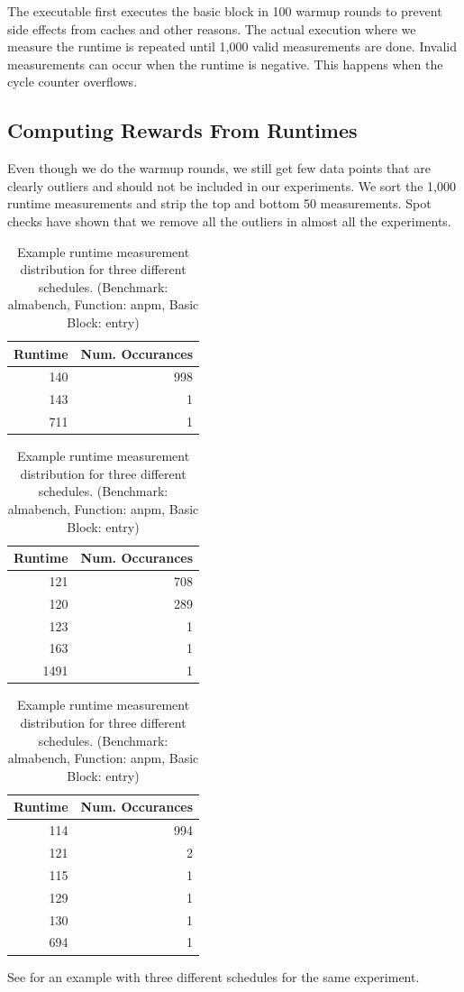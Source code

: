 The executable first executes the basic block in 100 warmup rounds to prevent side effects from caches and other reasons.
The actual execution where we measure the runtime is repeated until 1,000 valid measurements are done.
Invalid measurements can occur when the runtime is negative.
This happens when the cycle counter overflows.

\subsection{Computing Rewards From Runtimes}
Even though we do the warmup rounds, we still get few data points that are clearly outliers and should not be included in our experiments.
We sort the 1,000 runtime measurements and strip the top and bottom 50 measurements.
Spot checks have shown that we remove all the outliers in almost all the experiments.
\begin{table}
    \centering
    \begin{tabular}{@{}rr@{}}
        \toprule
        Runtime & Num. Occurances \\
        \midrule
        140 & 998 \\
        143 & 1 \\
        711 & 1 \\
        \bottomrule
    \end{tabular}
    \hspace{0.8cm}
    \begin{tabular}{@{}rr@{}}
        \toprule
        Runtime & Num. Occurances \\
        \midrule
        121 & 708 \\
        120 & 289 \\
        123 & 1 \\
        163 & 1 \\
        1491 & 1 \\
        \bottomrule
    \end{tabular}
    \hspace{0.8cm}
    \begin{tabular}{@{}rr@{}}
        \toprule
        Runtime & Num. Occurances \\
        \midrule
        114 & 994 \\
        121 & 2 \\
        115 & 1 \\
        129 & 1 \\
        130 & 1 \\
        694 & 1 \\
        \bottomrule
    \end{tabular}
    \caption[Example runtime measurement distribution]{Example runtime measurement distribution for three different schedules. (Benchmark: almabench, Function: anpm, Basic Block: entry)}
    \label{tab:approach:example_runtimes}
\end{table}
See  for an example with three different schedules for the same experiment.

